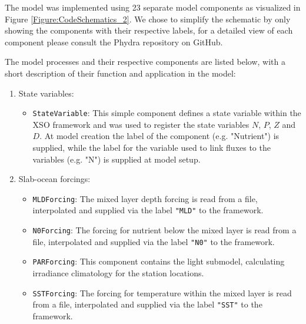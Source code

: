 \documentclass[journal abbreviation, manuscript]{copernicus}
\begin{document}
The model was implemented using 23 separate model components as visualized in Figure \ref{Figure:CodeSchematics_2}. We chose to simplify the schematic by only showing the components with their respective labels, for a detailed view of each component please consult the Phydra repository on GitHub.

The model processes and their respective components are listed below, with a short description of their function and application in the model:

\begin{enumerate}
    \item State variables:
    \begin{itemize}
        \item \texttt{StateVariable}: This simple component defines a state variable within the XSO framework and was used to register the state variables $N$, $P$, $Z$ and $D$. At model creation the label of the component (e.g. "Nutrient") is supplied, while the label for the variable used to link fluxes to the variables (e.g. "N") is supplied at model setup.
    \end{itemize}
    
    \item Slab-ocean forcings:
    \begin{itemize}
        \item \texttt{MLDForcing}: The mixed layer depth forcing is read from a file, interpolated and supplied via the label \texttt{"MLD"} to the framework. 
        \item \texttt{N0Forcing}: The forcing for nutrient below the mixed layer is read from a file, interpolated and supplied via the label \texttt{"N0"} to the framework. 
        \item \texttt{PARForcing}: This component contains the light submodel, calculating irradiance climatology for the station locations.
        \item \texttt{SSTForcing}: The forcing for temperature within the mixed layer is read from a file, interpolated and supplied via the label \texttt{"SST"} to the framework.
    \end{itemize}
    

\end{enumerate}
\end{document}
